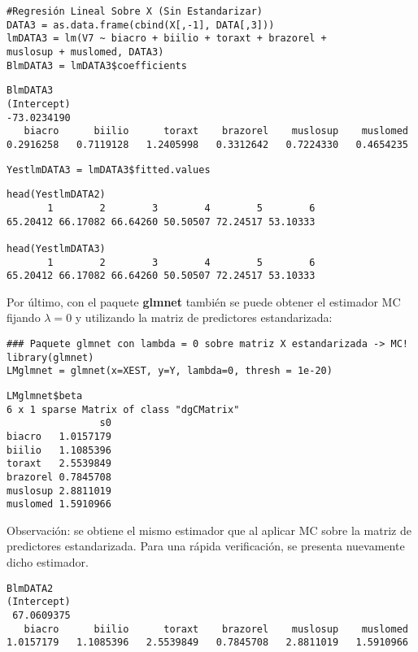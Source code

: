 \documentclass[a4paper,12pt]{report}
\begin{document}
{
\begin{verbatim}
#Regresión Lineal Sobre X (Sin Estandarizar)
DATA3 = as.data.frame(cbind(X[,-1], DATA[,3]))
lmDATA3 = lm(V7 ~ biacro + biilio + toraxt + brazorel +
muslosup + muslomed, DATA3)
BlmDATA3 = lmDATA3$coefficients
\end{verbatim}
}

{
\begin{verbatim}
BlmDATA3
(Intercept)    
-73.0234190
   biacro      biilio      toraxt    brazorel    muslosup    muslomed 
0.2916258   0.7119128   1.2405998   0.3312642   0.7224330   0.4654235 
\end{verbatim}
}

{
\begin{verbatim}
YestlmDATA3 = lmDATA3$fitted.values
\end{verbatim}
}

{
\begin{verbatim}
head(YestlmDATA2)
       1        2        3        4        5        6 
65.20412 66.17082 66.64260 50.50507 72.24517 53.10333 

head(YestlmDATA3)
       1        2        3        4        5        6 
65.20412 66.17082 66.64260 50.50507 72.24517 53.10333
\end{verbatim}
}

Por último, con el paquete \textbf{glmnet} también se puede obtener el estimador MC fijando $\lambda=0$ y utilizando la matriz de predictores estandarizada:

\begin{verbatim}
### Paquete glmnet con lambda = 0 sobre matriz X estandarizada -> MC!
library(glmnet)
LMglmnet = glmnet(x=XEST, y=Y, lambda=0, thresh = 1e-20)
\end{verbatim}

{
\begin{verbatim}
LMglmnet$beta
6 x 1 sparse Matrix of class "dgCMatrix"
                s0
biacro   1.0157179
biilio   1.1085396
toraxt   2.5539849
brazorel 0.7845708
muslosup 2.8811019
muslomed 1.5910966
\end{verbatim}
}

Observación: se obtiene el mismo estimador que al aplicar MC sobre la matriz de predictores estandarizada. Para una rápida verificación, se presenta nuevamente dicho estimador.

{
\begin{verbatim}
BlmDATA2 
(Intercept)     
 67.0609375 
   biacro      biilio      toraxt    brazorel    muslosup    muslomed 
1.0157179   1.1085396   2.5539849   0.7845708   2.8811019   1.5910966 
\end{verbatim}
}
\end{document}
